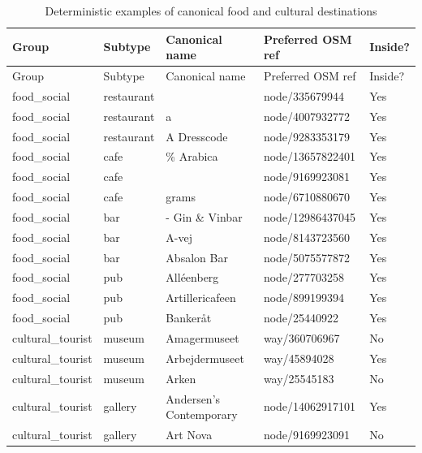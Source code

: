 \begin{landscape}
\small
\begin{longtable}{>{\raggedright\arraybackslash}p{3.0cm}>{\raggedright\arraybackslash}p{2.7cm}>{\raggedright\arraybackslash}p{9.0cm}>{\raggedright\arraybackslash}p{3.7cm}>{\raggedright\arraybackslash}p{1.6cm}}
\caption{Deterministic examples of canonical food and cultural destinations}\label{tab:destination-examples}\\
\toprule
Group & Subtype & Canonical name & Preferred OSM ref & Inside? \\
\midrule
\endfirsthead
\toprule
Group & Subtype & Canonical name & Preferred OSM ref & Inside? \\
\midrule
\endhead
food\_\allowbreak{}social & restaurant & 1899 & node/335679944 & Yes \\
food\_\allowbreak{}social & restaurant & 20 a & node/4007932772 & Yes \\
food\_\allowbreak{}social & restaurant & A Dresscode & node/9283353179 & Yes \\
food\_\allowbreak{}social & cafe & \% Arabica & node/13657822401 & Yes \\
food\_\allowbreak{}social & cafe & 1926 & node/9169923081 & Yes \\
food\_\allowbreak{}social & cafe & 20 grams & node/6710880670 & Yes \\
food\_\allowbreak{}social & bar & 1609 - Gin \& Vinbar & node/12986437045 & Yes \\
food\_\allowbreak{}social & bar & A-vej & node/8143723560 & Yes \\
food\_\allowbreak{}social & bar & Absalon Bar & node/5075577872 & Yes \\
food\_\allowbreak{}social & pub & Alléenberg & node/277703258 & Yes \\
food\_\allowbreak{}social & pub & Artillericafeen & node/899199394 & Yes \\
food\_\allowbreak{}social & pub & Bankeråt & node/25440922 & Yes \\
cultural\_\allowbreak{}tourist & museum & Amagermuseet & way/360706967 & No \\
cultural\_\allowbreak{}tourist & museum & Arbejdermuseet & way/45894028 & Yes \\
cultural\_\allowbreak{}tourist & museum & Arken & way/25545183 & No \\
cultural\_\allowbreak{}tourist & gallery & Andersen's Contemporary & node/14062917101 & Yes \\
cultural\_\allowbreak{}tourist & gallery & Art Nova & node/9169923091 & No \\

\end{longtable}
\end{landscape}

